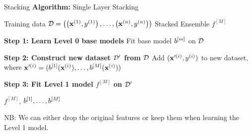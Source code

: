 \documentclass[11pt,compress,t,notes=noshow, xcolor=table]{beamer}
\begin{document}

\begin{vbframe}{Stacking}
\footnotesize
\textbf{Algorithm:} Single Layer Stacking
\begin{algorithmic}
    \Require Training data $\mathcal{D} = \left( \left(\mathbf{x}^{(1)}, y^{(1)}\right), \ldots, \left(\mathbf{x}^{(n)}, y^{(n)}\right)\right)$
    \Ensure Stacked Ensemble $f^{[M]}$

    \State
    \State \textbf{Step 1: Learn Level 0 base models}
        \State Fit base model $b^{[m]}$ on $\mathcal{D}$
    \EndFor

    \State
    \State \textbf{Step 2: Construct new dataset $\mathcal{D}^\prime$ from $\mathcal{D}$}
        \State Add $(\mathbf{x}^{\prime(i)}, y^{(i)})$ to new dataset, where $\mathbf{x}^{\prime(i)} = (b^{[1]}(\mathbf{x}^{(i)}), \ldots, b^{[M]}(\mathbf{x}^{(i)}))$
    \EndFor

    \State
    \State \textbf{Step 3: Fit Level 1 model $f^{[M]}$ on $\mathcal{D}^\prime$}

    \State \Return $f^{[M]}$, $b^{[1]}, \ldots, b^{[M]}$
\end{algorithmic}
NB: We can either drop the original features or keep them when learning the Level 1 model.

\end{vbframe}

\end{document}
